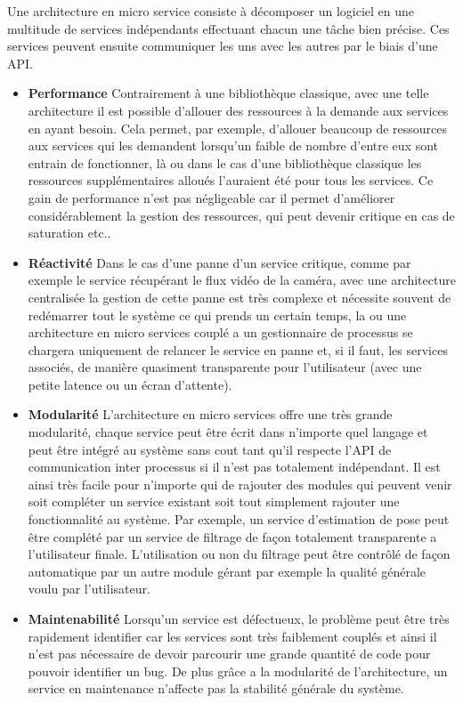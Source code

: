 Une architecture en micro service consiste à décomposer un logiciel en une multitude de services indépendants effectuant chacun une tâche bien précise. Ces services peuvent ensuite communiquer les uns avec les autres par le biais d'une API.

\begin{itemize}
\item \textbf{Performance} Contrairement à une bibliothèque classique, avec une telle architecture il est possible d'allouer des ressources à la demande aux services en ayant besoin. Cela permet, par exemple, d'allouer beaucoup de ressources aux services qui les demandent lorsqu'un faible de nombre d'entre eux sont entrain de fonctionner, là ou dans le cas d'une bibliothèque classique les ressources supplémentaires alloués l'auraient été pour tous les services. Ce gain de performance n'est pas négligeable car il permet d'améliorer considérablement la gestion des ressources, qui peut devenir critique en cas de saturation etc..

\item \textbf{Réactivité} Dans le cas d'une panne d'un service critique, comme par exemple le service récupérant le flux vidéo de la caméra, avec une architecture centralisée la gestion de cette panne est très complexe et nécessite souvent de redémarrer tout le système ce qui prends un certain temps, la ou une architecture en micro services couplé a un gestionnaire de processus se chargera uniquement de relancer le service en panne et, si il faut, les services associés, de manière quasiment transparente pour l'utilisateur (avec une petite latence ou un écran d'attente).

\item \textbf{Modularité} L'architecture en micro services offre une très grande modularité, chaque service peut être écrit dans n'importe quel langage et peut être intégré au système sans cout tant qu'il respecte l'API de communication inter processus si il n'est pas totalement indépendant. Il est ainsi très facile pour n'importe qui de rajouter des modules qui peuvent venir soit compléter un service existant soit tout simplement rajouter une fonctionnalité au système. Par exemple, un service d'estimation de pose peut être complété par un service de filtrage de façon totalement transparente a l'utilisateur finale. L'utilisation ou non du filtrage peut être contrôlé de façon automatique par un autre module gérant par exemple la qualité générale voulu par l'utilisateur.

\item \textbf{Maintenabilité} Lorsqu'un service est défectueux, le problème peut être très rapidement identifier car les services sont très faiblement couplés et ainsi il n'est pas nécessaire de devoir parcourir une grande quantité de code pour pouvoir identifier un bug. De plus grâce a la modularité de l'architecture, un service en maintenance n'affecte pas la stabilité générale du système.

\end{itemize}


